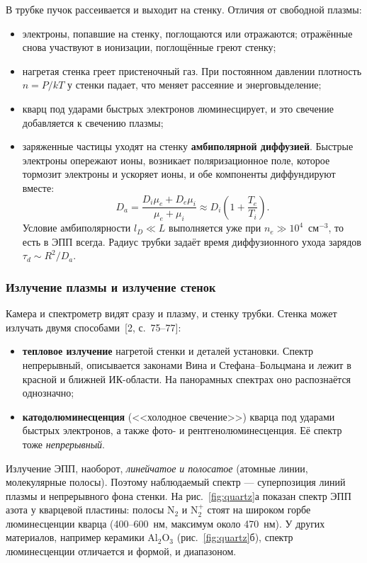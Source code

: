 \documentclass[12pt,a4paper]{article}
\newcommand{\Nt}{\mathrm{N_2}}
\begin{document}
В трубке пучок рассеивается и выходит на стенку. Отличия от свободной
плазмы:
\begin{itemize}
  \item электроны, попавшие на стенку, поглощаются или отражаются;
        отражённые снова участвуют в ионизации, поглощённые греют стенку;
  \item нагретая стенка греет пристеночный газ. При постоянном давлении
        плотность $n = P/kT$ у стенки падает, что меняет рассеяние и
        энерговыделение;
  \item кварц под ударами быстрых электронов люминесцирует, и это
        свечение добавляется к свечению плазмы;
  \item заряженные частицы уходят на стенку \textbf{амбиполярной
        диффузией}. Быстрые электроны опережают ионы, возникает
        поляризационное поле, которое тормозит электроны и ускоряет ионы,
        и обе компоненты диффундируют вместе:
        \begin{equation}
            D_a = \frac{D_i\mu_e + D_e\mu_i}{\mu_e+\mu_i}
            \approx D_i\left(1+\frac{T_e}{T_i}\right).
        \end{equation}
        Условие амбиполярности $l_D \ll L$ выполняется уже при
        $n_e \gg 10^4$~см$^{-3}$, то есть в ЭПП всегда. Радиус трубки
        задаёт время диффузионного ухода зарядов $\tau_d \sim R^2/D_a$.
\end{itemize}

\subsubsection{Излучение плазмы и излучение стенок}
\label{sec:quartz}

Камера и спектрометр видят сразу и плазму, и стенку трубки. Стенка может
излучать двумя способами~[2, с.~75--77]:
\begin{itemize}
  \item \textbf{тепловое излучение} нагретой стенки и деталей установки.
        Спектр непрерывный, описывается законами Вина и
        Стефана--Больцмана и лежит в красной и ближней ИК-области. На
        панорамных спектрах оно распознаётся однозначно;
  \item \textbf{катодолюминесценция} (<<холодное свечение>>) кварца под
        ударами быстрых электронов, а также фото- и
        рентгенолюминесценция. Её спектр тоже \emph{непрерывный}.
\end{itemize}
Излучение ЭПП, наоборот, \emph{линейчатое и полосатое} (атомные линии,
молекулярные полосы). Поэтому наблюдаемый спектр --- суперпозиция линий
плазмы и непрерывного фона стенки. На рис.~\ref{fig:quartz}а показан
спектр ЭПП азота у кварцевой пластины: полосы $\Nt$ и $\mathrm{N}_2^+$
стоят на широком горбе люминесценции кварца (400--600~нм, максимум
около 470~нм). У других материалов, например керамики Al$_2$O$_3$
(рис.~\ref{fig:quartz}б), спектр люминесценции отличается и формой, и
диапазоном.
\end{document}
